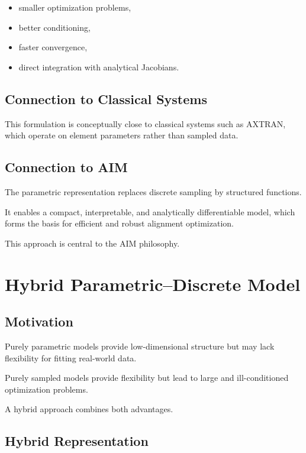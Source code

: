 \begin{itemize}
\item smaller optimization problems,
\item better conditioning,
\item faster convergence,
\item direct integration with analytical Jacobians.
\end{itemize}


\subsection{Connection to Classical Systems}

This formulation is conceptually close to classical systems such as
AXTRAN, which operate on element parameters rather than sampled data.


\subsection{Connection to AIM}

\begin{summary}
The parametric representation replaces discrete sampling by structured
functions.

It enables a compact, interpretable, and analytically differentiable
model, which forms the basis for efficient and robust alignment
optimization.

This approach is central to the AIM philosophy.
\end{summary}


\section{Hybrid Parametric--Discrete Model}

\subsection{Motivation}

Purely parametric models provide low-dimensional structure but may lack
flexibility for fitting real-world data.

Purely sampled models provide flexibility but lead to large and
ill-conditioned optimization problems.

A hybrid approach combines both advantages.


\subsection{Hybrid Representation}

